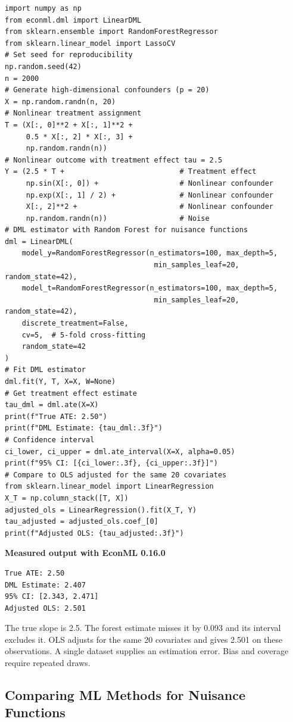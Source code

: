 \begin{verbatim}
import numpy as np
from econml.dml import LinearDML
from sklearn.ensemble import RandomForestRegressor
from sklearn.linear_model import LassoCV
# Set seed for reproducibility
np.random.seed(42)
n = 2000
# Generate high-dimensional confounders (p = 20)
X = np.random.randn(n, 20)
# Nonlinear treatment assignment
T = (X[:, 0]**2 + X[:, 1]**2 +
     0.5 * X[:, 2] * X[:, 3] +
     np.random.randn(n))
# Nonlinear outcome with treatment effect tau = 2.5
Y = (2.5 * T +                           # Treatment effect
     np.sin(X[:, 0]) +                   # Nonlinear confounder
     np.exp(X[:, 1] / 2) +               # Nonlinear confounder
     X[:, 2]**2 +                        # Nonlinear confounder
     np.random.randn(n))                 # Noise
# DML estimator with Random Forest for nuisance functions
dml = LinearDML(
    model_y=RandomForestRegressor(n_estimators=100, max_depth=5,
                                   min_samples_leaf=20, random_state=42),
    model_t=RandomForestRegressor(n_estimators=100, max_depth=5,
                                   min_samples_leaf=20, random_state=42),
    discrete_treatment=False,
    cv=5,  # 5-fold cross-fitting
    random_state=42
)
# Fit DML estimator
dml.fit(Y, T, X=X, W=None)
# Get treatment effect estimate
tau_dml = dml.ate(X=X)
print(f"True ATE: 2.50")
print(f"DML Estimate: {tau_dml:.3f}")
# Confidence interval
ci_lower, ci_upper = dml.ate_interval(X=X, alpha=0.05)
print(f"95% CI: [{ci_lower:.3f}, {ci_upper:.3f}]")
# Compare to OLS adjusted for the same 20 covariates
from sklearn.linear_model import LinearRegression
X_T = np.column_stack([T, X])
adjusted_ols = LinearRegression().fit(X_T, Y)
tau_adjusted = adjusted_ols.coef_[0]
print(f"Adjusted OLS: {tau_adjusted:.3f}")
\end{verbatim}

\textbf{Measured output with EconML 0.16.0}

\begin{verbatim}
True ATE: 2.50
DML Estimate: 2.407
95% CI: [2.343, 2.471]
Adjusted OLS: 2.501
\end{verbatim}

The true slope is 2.5. The forest estimate misses it by 0.093 and
its interval excludes it. OLS adjusts for the same 20 covariates and
gives 2.501 on these observations. A single dataset supplies an estimation
error. Bias and coverage require repeated draws.

\subsection{Comparing ML Methods for Nuisance
Functions}\label{_comparing_ml_methods_for_nuisance_functions}

